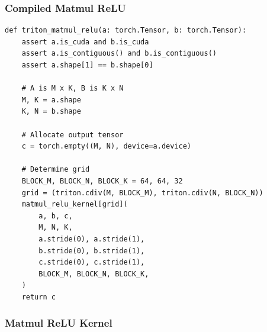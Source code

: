 \documentclass[12pt,twoside]{article}
\begin{document}
\subsubsection*{Compiled Matmul ReLU}

\begin{verbatim}
def triton_matmul_relu(a: torch.Tensor, b: torch.Tensor):
    assert a.is_cuda and b.is_cuda
    assert a.is_contiguous() and b.is_contiguous()
    assert a.shape[1] == b.shape[0]
    
    # A is M x K, B is K x N
    M, K = a.shape
    K, N = b.shape
    
    # Allocate output tensor
    c = torch.empty((M, N), device=a.device)
    
    # Determine grid
    BLOCK_M, BLOCK_N, BLOCK_K = 64, 64, 32
    grid = (triton.cdiv(M, BLOCK_M), triton.cdiv(N, BLOCK_N))
    matmul_relu_kernel[grid](
        a, b, c,
        M, N, K,
        a.stride(0), a.stride(1),
        b.stride(0), b.stride(1),
        c.stride(0), c.stride(1),
        BLOCK_M, BLOCK_N, BLOCK_K,
    )
    return c
\end{verbatim}

\subsubsection*{Matmul ReLU Kernel}
\end{document}
